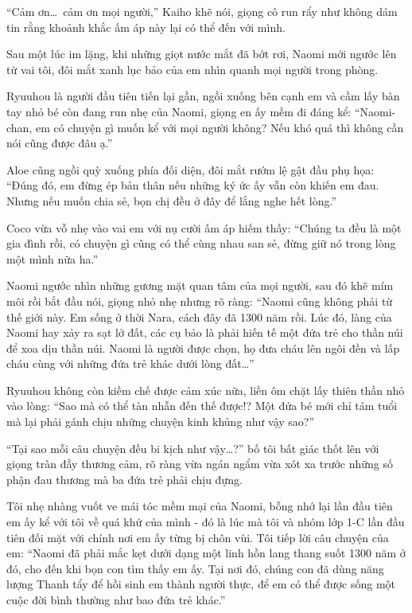 ﻿\documentclass[../main.tex]{subfiles}
\begin{document}
``Cảm ơn\dots\ cảm ơn mọi người,'' Kaiho khẽ nói, giọng cô run rẩy như không dám tin rằng khoảnh khắc ấm áp này lại có thể đến với mình.

\ct

Sau một lúc im lặng, khi những giọt nước mắt đã bớt rơi, Naomi mới ngước lên từ vai tôi, đôi mắt xanh lục bảo của em nhìn quanh mọi người trong phòng.

Ryuuhou là người đầu tiên tiến lại gần, ngồi xuống bên cạnh em và cầm lấy bàn tay nhỏ bé còn đang run nhẹ của Naomi, giọng en ấy mềm đi đáng kể: ``Naomi-chan, em có chuyện gì muốn kể với mọi người không? Nếu khó quá thì không cần nói cũng được đâu ạ.''

Aloe cũng ngồi quỳ xuống phía đối diện, đôi mắt rướm lệ gật đầu phụ họa: ``Đúng đó, em đừng ép bản thân nếu những ký ức ấy vẫn còn khiến em đau. Nhưng nếu muốn chia sẻ, bọn chị đều ở đây để lắng nghe hết lòng.''

Coco vừa vỗ nhẹ vào vai em với nụ cười ấm áp hiếm thấy: ``Chúng ta đều là một gia đình rồi, có chuyện gì cũng có thể cùng nhau san sẻ, đừng giữ nó trong lòng một mình nữa ha.''

Naomi ngước nhìn những gương mặt quan tâm của mọi người, sau đó khẽ mím môi rồi bắt đầu nói, giọng nhỏ nhẹ nhưng rõ ràng: ``Naomi cũng không phải từ thế giới này. Em sống ở thời Nara, cách đây đã 1300 năm rồi. Lúc đó, làng của Naomi hay xảy ra sạt lở đất, các cụ bảo là phải hiến tế một đứa trẻ cho thần núi để xoa dịu thần núi. Naomi là người được chọn, họ đưa cháu lên ngôi đền và lấp cháu cùng với những đứa trẻ khác dưới lòng đất\dots''

Ryuuhou không còn kiềm chế được cảm xúc nữa, liền ôm chặt lấy thiên thần nhỏ vào lòng: ``Sao mà có thể tàn nhẫn đến thế được!? Một đứa bé mới chỉ tám tuổi mà lại phải gánh chịu những chuyện kinh khủng như vậy sao?''

``Tại sao mỗi câu chuyện đều bi kịch như vậy\dots?'' bố tôi bất giác thốt lên với giọng tràn đầy thương cảm, rõ ràng vừa ngán ngẩm vừa xót xa trước những số phận đau thương mà ba đứa trẻ phải chịu đựng.

Tôi nhẹ nhàng vuốt ve mái tóc mềm mại của Naomi, bỗng nhớ lại lần đầu tiên em ấy kể với tôi về quá khứ của mình - đó là lúc mà tôi và nhóm lớp 1-C lần đầu tiên đối mặt với chính nơi em ấy từng bị chôn vùi. Tôi tiếp lời câu chuyện của em: ``Naomi đã phải mắc kẹt dưới dạng một linh hồn lang thang suốt 1300 năm ở đó, cho đến khi bọn con tìm thấy em ấy. Tại nơi đó, chúng con đã dùng năng lượng Thanh tẩy để hồi sinh em thành người thực, để em có thể được sống một cuộc đời bình thường như bao đứa trẻ khác.''
\end{document}
